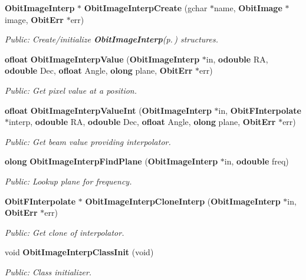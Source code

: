 \begin{CompactItemize}
{\bf Obit\-Image\-Interp} $\ast$ {\bf Obit\-Image\-Interp\-Create} (gchar $\ast$name, {\bf Obit\-Image} $\ast$image, {\bf Obit\-Err} $\ast$err)
\begin{CompactList}\small\item\em Public: Create/initialize {\bf Obit\-Image\-Interp}{\rm (p.\,\pageref{structObitImageInterp})} structures. \item\end{CompactList}\item 
{\bf ofloat} {\bf Obit\-Image\-Interp\-Value} ({\bf Obit\-Image\-Interp} $\ast$in, {\bf odouble} RA, {\bf odouble} Dec, {\bf ofloat} Angle, {\bf olong} plane, {\bf Obit\-Err} $\ast$err)
\begin{CompactList}\small\item\em Public: Get pixel value at a position. \item\end{CompactList}\item 
{\bf ofloat} {\bf Obit\-Image\-Interp\-Value\-Int} ({\bf Obit\-Image\-Interp} $\ast$in, {\bf Obit\-FInterpolate} $\ast$interp, {\bf odouble} RA, {\bf odouble} Dec, {\bf ofloat} Angle, {\bf olong} plane, {\bf Obit\-Err} $\ast$err)
\begin{CompactList}\small\item\em Public: Get beam value providing interpolator. \item\end{CompactList}\item 
{\bf olong} {\bf Obit\-Image\-Interp\-Find\-Plane} ({\bf Obit\-Image\-Interp} $\ast$in, {\bf odouble} freq)
\begin{CompactList}\small\item\em Public: Lookup plane for frequency. \item\end{CompactList}\item 
{\bf Obit\-FInterpolate} $\ast$ {\bf Obit\-Image\-Interp\-Clone\-Interp} ({\bf Obit\-Image\-Interp} $\ast$in, {\bf Obit\-Err} $\ast$err)
\begin{CompactList}\small\item\em Public: Get clone of interpolator. \item\end{CompactList}\item 
void {\bf Obit\-Image\-Interp\-Class\-Init} (void)
\begin{CompactList}\small\item\em Public: Class initializer. \item\end{CompactList}\end{CompactItemize}


